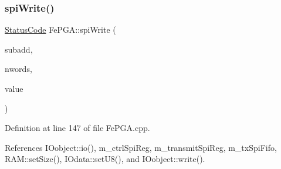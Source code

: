 \subsubsection{\texorpdfstring{spi\+Write()}{spiWrite()}\hspace{0.1cm}{\footnotesize\ttfamily [2/3]}}
{\footnotesize\ttfamily \hyperlink{classStatusCode}{Status\+Code} Fe\+P\+G\+A\+::spi\+Write (\begin{DoxyParamCaption}\item[{unsigned int}]{subadd,  }\item[{unsigned int}]{nwords,  }\item[{Py\+Object $\ast$}]{value }\end{DoxyParamCaption})}



Definition at line 147 of file Fe\+P\+G\+A.\+cpp.



References I\+Oobject\+::io(), m\+\_\+ctrl\+Spi\+Reg, m\+\_\+transmit\+Spi\+Reg, m\+\_\+tx\+Spi\+Fifo, R\+A\+M\+::set\+Size(), I\+Odata\+::set\+U8(), and I\+Oobject\+::write().


